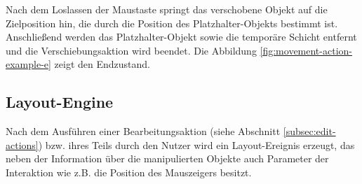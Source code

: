 Nach dem Loslassen der Maustaste springt das verschobene Objekt auf die Zielposition hin, die durch die Position des Platzhalter-Objekts bestimmt ist. Anschließend werden das Platzhalter-Objekt sowie die temporäre Schicht entfernt und die Verschiebungsaktion wird beendet. Die Abbildung \ref{fig:movement-action-example-e} zeigt den Endzustand.




\subsection{Layout-Engine}

Nach dem Ausführen einer Bearbeitungsaktion (siehe Abschnitt \ref{subsec:edit-actions}) bzw. ihres Teils durch den Nutzer wird ein Layout-Ereignis erzeugt, das neben der Information über die manipulierten Objekte auch Parameter der Interaktion wie z.B. die Position des Mauszeigers besitzt.


















